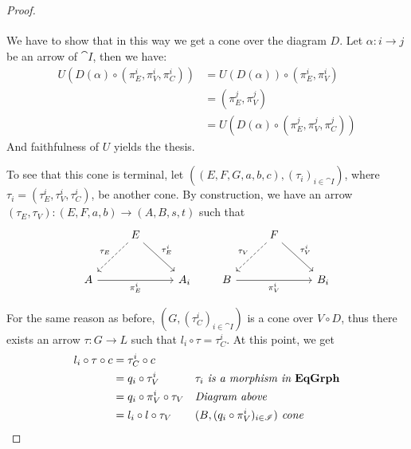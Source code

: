 \begin{proof}
\[\begin{tikzcd}
        \end{tikzcd}
    \]
    We have to show that in this way we get a cone over the diagram $D$. Let $\alpha : i\to j$ be an arrow of $\cat{I}$, then we have:
    \begin{align*}
    U(D(\alpha)\circ (\pi_E^i, \pi_V^i, \pi_C^i))  &=  U(D(\alpha))\circ(\pi_E^i, \pi_V^i)\\
                                                   &=  (\pi_E^j, \pi_V^j)\\
                                                   &=  U(D(\alpha)\circ (\pi_E^j, \pi_V^j, \pi_C^j))
    \end{align*}
    And faithfulness of $U$ yields the thesis.

	To see that this cone is terminal, let $((E, F, G, a, b, c), (\tau_i)_{i \in \cat I})$, where $\tau_i = (\tau_E^i, \tau_V^i, \tau_C^i)$, be another cone. By construction, we have an arrow $(\tau_E, \tau_V):(E, F, a, b) \to (A, B, s, t)$ such that
    \[
        \begin{tikzcd}[row sep = 26, column sep = 26]
            & E \arrow[dl, dashed, "{\tau_E}" swap] \arrow[dr, "{\tau_E^i}"] & \\
            A \arrow[rr, "{\pi_E^i}" swap] & & A_i 
        \end{tikzcd}
        \qquad
        \begin{tikzcd}[row sep = 26, column sep = 26]
            & F \arrow[dl, dashed, "{\tau_V}" swap] \arrow[dr, "{\tau_V^i}"] & \\
            B \arrow[rr, "{\pi_V^i}" swap] & & B_i 
        \end{tikzcd}
    \]

    For the same reason as before, $(G, (\tau_C^i)_{i\in \cat I})$ is a cone over $V \circ D$, thus there exists an arrow $\tau : G \to L$ such that $l_i \circ \tau = \tau_C^i$. At this point, we get
    \begin{align*}
        l_i\circ \tau \circ c 
                        &= \tau_C^i\circ c              && \\
                        &=q_i\circ \tau_V^i             && \textit{$\tau_i$ is a morphism in $\mathbf{EqGrph}$}\\
                        &=q_i\circ \pi_V^i\circ \tau_V  && \textit{Diagram above} \\
                        &=l_i\circ l\circ \tau_V        && \textit{$(B, (q_i\circ \pi_V^i)_{i \in \mathscr{I}})$ cone} 
    \end{align*} 


\end{proof}
